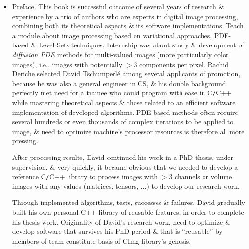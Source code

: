 \documentclass{article}
\begin{document}
\begin{itemize}
    {\sf Christophe Tilmant} is associate professor in computer science at Clermont-Auvergne University. His research activities include image processing \& AI, where he has authored $> 30$ papers. His teaching includes DL, image processing \& network security. He participates or leads several French research programs.
    
    {\sc Vincent Barra} is a full processor in CS at Clermont-Auvergne University \& associate director of LIMOS Lab. He teaches AI \& image processing in engineering schools \& master's programs. His research activities focus on $n$-dimensional data analysis with methodological \& application aspects in various fields. He has authored $> 90$ paperss in journals or conferences \& participates or leads several French \& European research programs.
    \item {\sf Preface.} This book is successful outcome of several years of research \& experience by a trio of authors who are experts in digital image processing, combining both its theoretical aspects \& its software implementations. Teach a module about image processing based on variational approaches, PDE-based \& Level Sets techniques. Internship was about study \& development of {\it diffusion PDE} methods for multi-valued images (more particularly color images), i.e., images with potentially $> 3$ components per pixel. {\sc Rachid Deriche} selected {\sc David Tschumperlé} among several applicants of promotion, because he was also a general engineer in CS, \& his double background perfectly met need for a trainee who could program with ease in C{\tt/}C++ while mastering theoretical aspects \& those related to an efficient software implementation of developed algorithms. PDE-based methods often require several hundreds or even thousands of complex iterations to be applied to image, \& need to optimize machine's processor resources is therefore all more pressing.
    
    After processing results, {\sc David} continued his work in a PhD thesis, under supervision. \& very quickly, it became obvious that we needed to develop a reference C{\tt/}C++ library to process images with $> 3$ channels or volume images with any values (matrices, tensors, $\ldots$) to develop our research work.
    
    Through implemented algorithms, tests, successes \& failures, {\sc David} gradually built his own personal C++ library of reusable features, in order to complete his thesis work. Originality of {\sc David}'s research work, need to optimize \& develop software that survives his PhD period \& that is ``reusable'' by members of team constitute basis of CImg library's genesis.
    

\end{itemize}
\end{document}
